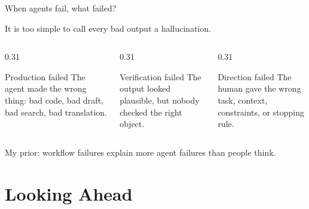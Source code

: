 \documentclass[aspectratio=169,11pt]{beamer}
\begin{document}
\begin{frame}{When agents fail, what failed?}

It is too simple to call every bad output a hallucination.

\vspace{0.3cm}

\begin{columns}[T]
\begin{column}{0.31\textwidth}
\begin{block}{Production failed}
\footnotesize
The agent made the wrong thing: bad code, bad draft, bad search, bad translation.
\end{block}
\end{column}
\begin{column}{0.31\textwidth}
\begin{block}{Verification failed}
\footnotesize
The output looked plausible, but nobody checked the right object.
\end{block}
\end{column}
\begin{column}{0.31\textwidth}
\begin{block}{Direction failed}
\footnotesize
The human gave the wrong task, context, constraints, or stopping rule.
\end{block}
\end{column}
\end{columns}

\vspace{0.4cm}

\begin{center}
\alert{My prior: workflow failures explain more agent failures than people think.}
\end{center}

\end{frame}


\section{Looking Ahead}
\end{document}
